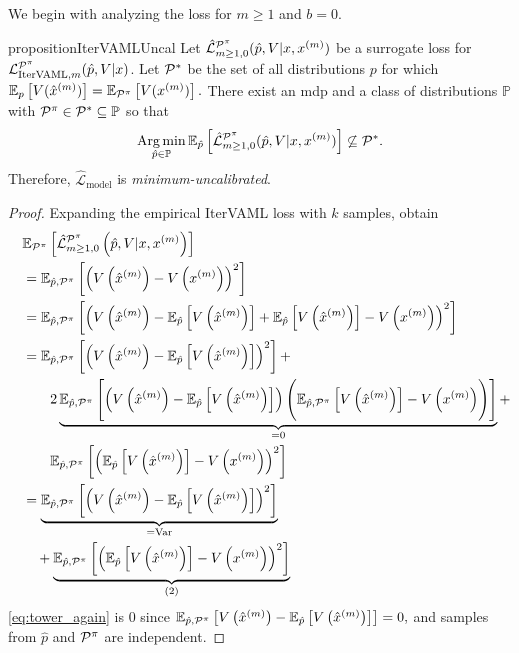 We begin with analyzing the loss for $m\geq1$ and $b=0$.
\begin{restatable}{proposition}{IterVAMLUncal}\label{prop:cvaml:2_1}
    Let $\hat{\mathcal{L}}^{\P^\pi}_{m\geq1,0}(\hat{p},V|x,x^{(m)})$ be a surrogate loss for $\mathcal{L}_{\mathrm{IterVAML}, m}^{\P^\pi}(\hat{p}, V|x)$.
    Let $\P^*$ be the set of all distributions $p$ for which $\EEX{p}{V(\hat{x}^{(m)})} = \EEX{\P^\pi}{V(x^{(m)})}.$
    There exist an \ac{mdp}   and a class of distributions $\mathbb{P}$ with $\P^\pi \in \P^* \subseteq \mathbb{P}$ so that $$\Argmin_{\hat{p} \in \mathbb{P}} \mathbb{E}_{\hat{p}}\left[\hat{\mathcal{L}}^{\P^\pi}_{m\geq1,0}(\hat{p},V|x,x^{(m)})\right] \not\subseteq \P^*.$$
    Therefore, $\hat{\mathcal{L}}_\mathrm{model}$ is \emph{minimum-uncalibrated}.
\end{restatable}
\begin{proof}
Expanding the empirical IterVAML loss with $k$ samples, obtain
\begin{align}
   & \EEX{\P^\pi}{\hat{\mathcal{L}}^{\P^\pi}_{m\geq1,0}\left(\hat{p},V|x,x^{(m)}\right)} \\
   \quad & =  \EEX{\hat{p},\P^\pi}{\left(\muV{m} - V\left(x^{(m)}\right)\right)^2} \\
   \quad & =  \EEX{\hat{p},\P^\pi}{\left(\muV{m} - \EEX{\hat{p}}{\muV{m}} + \EEX{\hat{p}}{\muV{m}} - V\left(x^{(m)}\right)\right)^2} \\
   \quad & =  \EEX{\hat{p},\P^\pi}{\left(\muV{m} - \EEX{\hat{p}}{V\left(\hat{x}^{(m)}\right)}\right)^2} + \\ 
   \quad &  \quad \quad  2 \underbrace{\EEX{\hat{p},\P^\pi}{\roundb{\muV{m} - \EEX{\hat{p}}{V\left(\hat{x}^{(m)}\right)}}\Biggl(\EEX{\hat{p},\P^\pi}{V\left(\hat{x}^{(m)}\right)} - V\left(x^{(m)}\right)\Biggr)}}_{=0} + \label{eq:tower_again}\nonumber \\
   \quad &  \quad \quad  \EEX{\hat{p},\P^\pi}{\left(\EEX{\hat{p}}{V\left(\hat{x}^{(m)}\right)} - V\left(x^{(m)}\right)\right)^2}\nonumber\\
   \quad & =  \underbrace{\EEX{\hat{p},\P^\pi}{\left(V\left(\hat{x}^{(m)}\right) - \EEX{\hat{p}}{V\left(\hat{x}^{(m)}\right)}\right)^2}}_{= \mathrm{Var}} \\
   \quad & \quad + \underbrace{\EEX{\hat{p},\P^\pi}{\left(\EEX{\hat{p}}{V\left(\hat{x}^{(m)}\right)} - V\left(x^{(m)}\right)\right)^2}}_{(2)}\nonumber
\end{align}
\autoref{eq:tower_again} is $0$ since $\EEX{\hat{p},\P^\pi}{\muV{m} - \EEX{\hat{p}}{V\left(\hat{x}^{(m)}\right)}} = 0,$ and samples from $\hat{p}$ and $\P^\pi$ are independent.


\end{proof}
